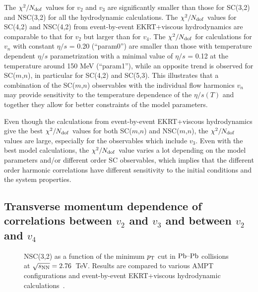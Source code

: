 The $\chi^2/N_{\rm dof}$ values for $v_2$ and $v_3$ are significantly smaller than those for SC(3,2) and NSC(3,2) for all the hydrodynamic calculations. The $\chi^2/N_{\rm dof}$ values for SC(4,2) and NSC(4,2) from event-by-event EKRT+viscous hydrodynamics are comparable to that for $v_2$ but larger than for $v_4$. The $\chi^2/N_{\rm dof}$ for calculations for $v_n$ with constant $\eta/s$ = 0.20 (``param0'') are smaller than those with temperature dependent $\eta/s$ parametrization with a minimal value of $\eta/s$ = 0.12 at the temperature around 150 MeV (``param1''), while an opposite trend is observed for SC($m$,$n$), in particular for SC(4,2) and SC(5,3). 
This illustrates that a combination of the SC($m$,$n$) observables with the individual flow harmonics $v_n$ may provide sensitivity to the temperature dependence of the $\eta/s(T)$ and together they allow for better constraints of the model parameters.

Even though the calculations from event-by-event EKRT+viscous hydrodynamics give the best $\chi^2/N_{\rm dof}$ values for both SC($m$,$n$) and NSC($m$,$n$), the $\chi^2/N_{\rm dof}$
values are large, especially for the observables which include $v_3$. 
Even with the best model calculations, the $\chi^2/N_{\rm dof}$ value varies a lot depending on the model parameters and/or different order SC observables, which implies that the different order harmonic correlations have different sensitivity to the initial conditions and the system properties.

\subsection{Transverse momentum dependence of correlations between $v_2$ and $v_3$ and between $v_2$ and $v_4$}
\label{sec:ptdepsc}
\begin{figure}[t!]
             \begin{center}
              \end{center}
             \caption{NSC(3,2) as a function of the minimum $p_{\rm T}$ cut in $\textnormal{Pb--Pb}$ collisions at $\sqrt{s_{\textnormal{NN}}}=2.76$~TeV. Results are compared to various AMPT configurations and event-by-event EKRT+viscous hydrodynamic calculations~\cite{Niemi:2015qia}.}
             \label{fig:Figure_8}
\end{figure}

